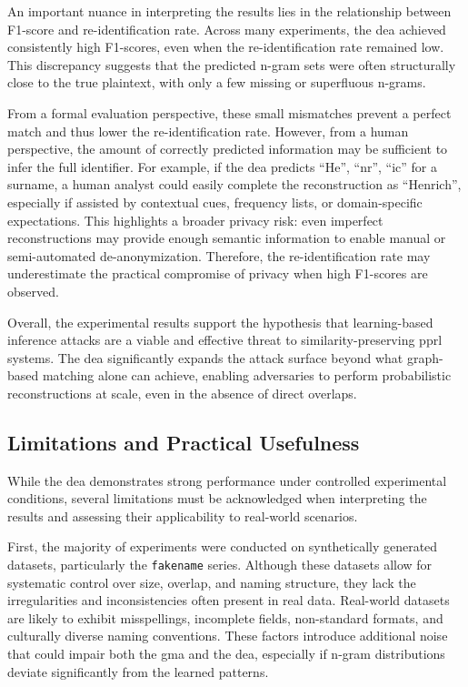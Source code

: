 An important nuance in interpreting the results lies in the relationship between F1-score and re-identification rate.
Across many experiments, the \ac{dea} achieved consistently high F1-scores, even when the re-identification rate remained low.
This discrepancy suggests that the predicted n-gram sets were often structurally close to the true plaintext, with only a few missing or superfluous n-grams.

From a formal evaluation perspective, these small mismatches prevent a perfect match and thus lower the re-identification rate.
However, from a human perspective, the amount of correctly predicted information may be sufficient to infer the full identifier.
For example, if the \ac{dea} predicts ``He'', ``nr'', ``ic'' for a surname, a human analyst could easily complete the reconstruction as ``Henrich'', especially if assisted by contextual cues, frequency lists, or domain-specific expectations.
This highlights a broader privacy risk: even imperfect reconstructions may provide enough semantic information to enable manual or semi-automated de-anonymization.
Therefore, the re-identification rate may underestimate the practical compromise of privacy when high F1-scores are observed.

Overall, the experimental results support the hypothesis that learning-based inference attacks are a viable and effective threat to similarity-preserving \ac{pprl} systems.
The \ac{dea} significantly expands the attack surface beyond what graph-based matching alone can achieve, enabling adversaries to perform probabilistic reconstructions at scale, even in the absence of direct overlaps.


\subsection{Limitations and Practical Usefulness}

While the \ac{dea} demonstrates strong performance under controlled experimental conditions, several limitations must be acknowledged when interpreting the results and assessing their applicability to real-world scenarios.

First, the majority of experiments were conducted on synthetically generated datasets, particularly the \texttt{fakename} series.
Although these datasets allow for systematic control over size, overlap, and naming structure, they lack the irregularities and inconsistencies often present in real data.
Real-world datasets are likely to exhibit misspellings, incomplete fields, non-standard formats, and culturally diverse naming conventions.
These factors introduce additional noise that could impair both the \ac{gma} and the \ac{dea}, especially if n-gram distributions deviate significantly from the learned patterns.

